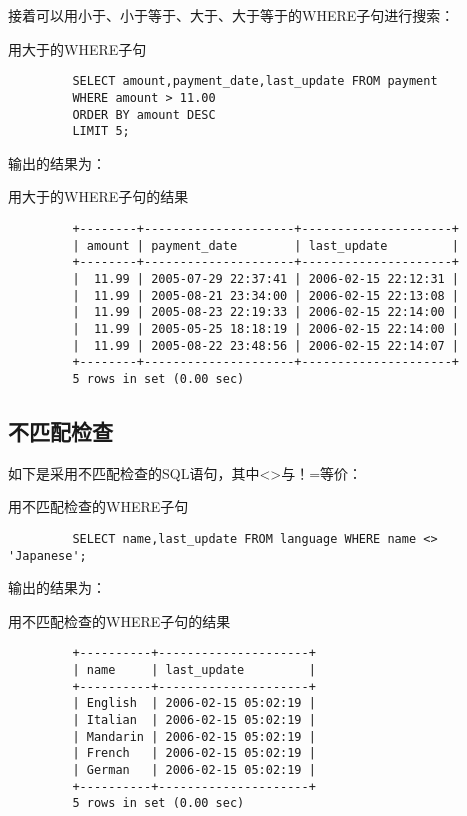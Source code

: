 \documentclass[UTF8]{article}
\begin{document}
接着可以用小于、小于等于、大于、大于等于的WHERE子句进行搜索：
\begin{listing}[H]
	\caption{用大于的WHERE子句}
	\label{code:unequalwhereclause}
	\begin{verbatim}
         SELECT amount,payment_date,last_update FROM payment 
         WHERE amount > 11.00 
         ORDER BY amount DESC 
         LIMIT 5;
        \end{verbatim}
\end{listing}

输出的结果为：

\begin{listing}[H]
	\caption{用大于的WHERE子句的结果}
	\label{code:unequalwhereclauseresult}
	\begin{verbatim}
         +--------+---------------------+---------------------+
         | amount | payment_date        | last_update         |
         +--------+---------------------+---------------------+
         |  11.99 | 2005-07-29 22:37:41 | 2006-02-15 22:12:31 |
         |  11.99 | 2005-08-21 23:34:00 | 2006-02-15 22:13:08 |
         |  11.99 | 2005-08-23 22:19:33 | 2006-02-15 22:14:00 |
         |  11.99 | 2005-05-25 18:18:19 | 2006-02-15 22:14:00 |
         |  11.99 | 2005-08-22 23:48:56 | 2006-02-15 22:14:07 |
         +--------+---------------------+---------------------+
         5 rows in set (0.00 sec)

        \end{verbatim}
\end{listing}

\subsection{不匹配检查}
如下是采用不匹配检查的SQL语句，其中<>与！=等价：
\begin{listing}[H]
	\caption{用不匹配检查的WHERE子句}
	\label{code:unmatchwhereclause}
	\begin{verbatim}
         SELECT name,last_update FROM language WHERE name <> 'Japanese';
        \end{verbatim}
\end{listing}

输出的结果为：

\begin{listing}[H]
	\caption{用不匹配检查的WHERE子句的结果}
	\label{code:unmatchwhereclauseresult}
	\begin{verbatim}
         +----------+---------------------+
         | name     | last_update         |
         +----------+---------------------+
         | English  | 2006-02-15 05:02:19 |
         | Italian  | 2006-02-15 05:02:19 |
         | Mandarin | 2006-02-15 05:02:19 |
         | French   | 2006-02-15 05:02:19 |
         | German   | 2006-02-15 05:02:19 |
         +----------+---------------------+
         5 rows in set (0.00 sec)

        \end{verbatim}
\end{listing}
\end{document}
